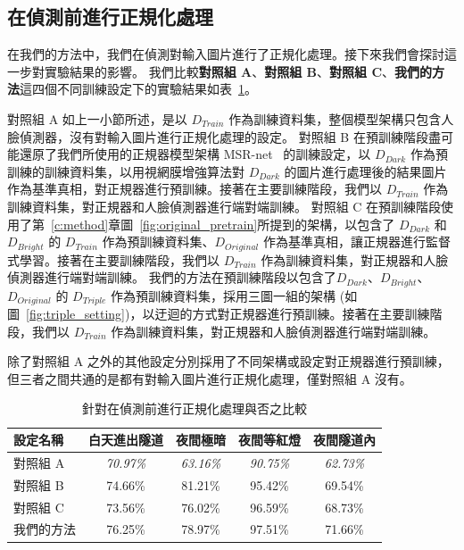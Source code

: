 \subsection{在偵測前進行正規化處理}

在我們的方法中，我們在偵測對輸入圖片進行了正規化處理。接下來我們會探討這一步對實驗結果的影響。
我們比較\textbf{對照組 A}、\textbf{對照組 B}、\textbf{對照組 C}、\textbf{我們的方法}這四個不同訓練設定下的實驗結果如表~\ref{table:normalize_compare}。

對照組 A 如上一小節所述，是以 $D_{Train}$ 作為訓練資料集，整個模型架構只包含人臉偵測器，沒有對輸入圖片進行正規化處理的設定。
對照組 B 在預訓練階段盡可能還原了我們所使用的正規器模型架構 MSR-net~\cite{shen2017msr} 的訓練設定，以 $D_{Dark}$ 作為預訓練的訓練資料集，以用視網膜增強算法對 $D_{Dark}$ 的圖片進行處理後的結果圖片作為基準真相，對正規器進行預訓練。接著在主要訓練階段，我們以 $D_{Train}$ 作為訓練資料集，對正規器和人臉偵測器進行端對端訓練。
對照組 C 在預訓練階段使用了第~\ref{c:method}章圖~\ref{fig:original_pretrain}所提到的架構，以包含了 $D_{Dark}$ 和 $D_{Bright}$ 的 $D_{Train}$ 作為預訓練資料集、$D_{Original}$ 作為基準真相，讓正規器進行監督式學習。接著在主要訓練階段，我們以 $D_{Train}$ 作為訓練資料集，對正規器和人臉偵測器進行端對端訓練。
我們的方法在預訓練階段以包含了$D_{Dark}$、$D_{Bright}$、$D_{Original}$ 的 $D_{Triple}$ 作為預訓練資料集，採用三圖一組的架構 (如圖~\ref{fig:triple_setting})，以迂迴的方式對正規器進行預訓練。接著在主要訓練階段，我們以 $D_{Train}$ 作為訓練資料集，對正規器和人臉偵測器進行端對端訓練。

除了對照組 A 之外的其他設定分別採用了不同架構或設定對正規器進行預訓練，但三者之間共通的是都有對輸入圖片進行正規化處理，僅對照組 A 沒有。

\begin{table}[ht]
    \caption{針對在偵測前進行正規化處理與否之比較}
    \centering
    \begin{tabular}{l c c c c}
        \hline
        設定名稱 & 白天進出隧道 & 夜間極暗 & 夜間等紅燈 & 夜間隧道內 \\
        \hline
        對照組 A & \emph{70.97\%} & \emph{63.16\%} & \emph{90.75\%} & \emph{62.73\%} \\
        \hline
        對照組 B & 74.66\% & 81.21\% &95.42\% & 69.54\% \\
        對照組 C & 73.56\% & 76.02\% & 96.59\% & 68.73\% \\
        我們的方法 & 76.25\% & 78.97\% & 97.51\% & 71.66\% \\
        \hline
    \end{tabular}
    \label{table:normalize_compare}
\end{table}

